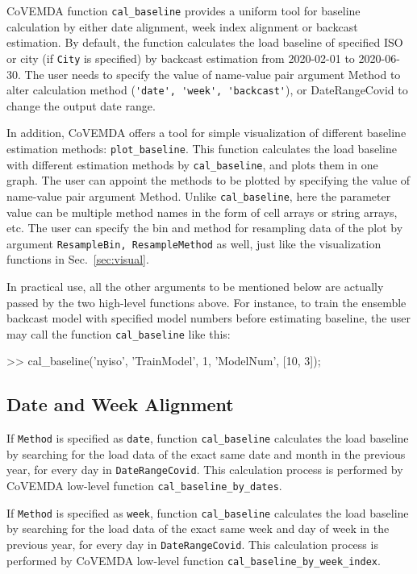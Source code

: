 \documentclass[11pt]{article}
\newcommand{\covemda}{CoVEMDA}
\numberwithin{equation}{section}
\numberwithin{table}{section}
\numberwithin{figure}{section}
\begin{document}
\covemda{} function \verb!cal_baseline! provides a uniform tool for baseline calculation by either date alignment, week index alignment or backcast estimation. By default, the function calculates the load baseline of specified ISO or city (if \verb!City! is specified) by backcast estimation from 2020-02-01 to 2020-06-30. The user needs to specify the value of name-value pair argument Method to alter calculation method (\verb!'date', 'week', 'backcast'!), or DateRangeCovid to change the output date range.

In addition, \covemda{} offers a tool for simple visualization of different baseline estimation methods: \verb!plot_baseline!. This function calculates the load baseline with different estimation methods by \verb!cal_baseline!, and plots them in one graph. The user can appoint the methods to be plotted by specifying the value of name-value pair argument Method. Unlike \verb!cal_baseline!, here the parameter value can be multiple method names in the form of cell arrays or string arrays, etc. The user can specify the bin and method for resampling data of the plot by argument \verb!ResampleBin, ResampleMethod! as well, just like the visualization functions in Sec.~\ref{sec:visual}.

In practical use, all the other arguments to be mentioned below are actually passed by the two high-level functions above. For instance, to train the ensemble backcast model with specified model numbers before estimating baseline, the user may call the function \verb!cal_baseline! like this:

\begin{Code}
>> cal_baseline('nyiso', 'TrainModel', 1, 'ModelNum', [10, 3]);
\end{Code}

\subsection{Date and Week Alignment}



If \verb!Method! is specified as \verb!date!, function \verb!cal_baseline! calculates the load baseline by searching for the load data of the exact same date and month in the previous year, for every day in \verb!DateRangeCovid!. This calculation process is performed by \covemda{} low-level function \verb!cal_baseline_by_dates!.

If \verb!Method! is specified as \verb!week!, function \verb!cal_baseline! calculates the load baseline by searching for the load data of the exact same week and day of week in the previous year, for every day in \verb!DateRangeCovid!. This calculation process is performed by \covemda{} low-level function \verb!cal_baseline_by_week_index!.
\end{document}
